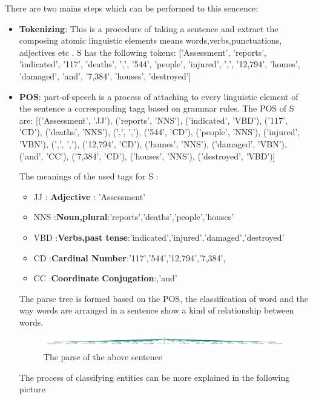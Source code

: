 There are two mains steps which can be performed to this sencence:
\begin{itemize}
\item \textbf{Tokenizing}: This is a procedure of taking a sentence and extract the composing atomic linguistic elements means words,verbs,punctuations, adjectives etc .
S has the following tokens: ['Assessment', 'reports', 'indicated', '117', 'deaths', ',', '544', 'people', 'injured', ',', '12,794', 'homes', 'damaged', 'and', '7,384', 'houses', 'destroyed']
\item \textbf{POS}: part-of-speech is a process of attaching to every linguistic element of the sentence a corresponding tagg based on grammar rules.
The POS of S  are: 
[('Assessment', 'JJ'), ('reports', 'NNS'), ('indicated', 'VBD'), ('117', 'CD'), ('deaths', 'NNS'), (',', ','), ('544', 'CD'), ('people', 'NNS'), ('injured', 'VBN'), (',', ','), ('12,794', 'CD'), ('homes', 'NNS'), ('damaged', 'VBN'), ('and', 'CC'), ('7,384', 'CD'), ('houses', 'NNS'), ('destroyed', 'VBD')]

The meanings of the used tags for S :

\begin{itemize}
\item JJ : \textbf{Adjective} :  'Assessment'   
\item NNS :\textbf{Noun,plural}:'reports','deaths','people','houses'
\item VBD :\textbf{Verbs,past tense}:'indicated','injured','damaged','destroyed'
\item CD :\textbf{Cardinal Number}:'117','544','12,794','7,384',
\item CC :\textbf{Coordinate Conjugation}:,'and'
\end{itemize}
The parse tree is formed based on the POS, the classification of word and the way words are arranged in a sentence show a kind of relationship between words.
\begin{figure}[hbtp]
\caption{The parse of the above sentence}
\centering
\includegraphics[scale=0.5]{images/parse.png}
\end{figure}


The process of classifying entities can be more explained in the following picture


\end{itemize}
